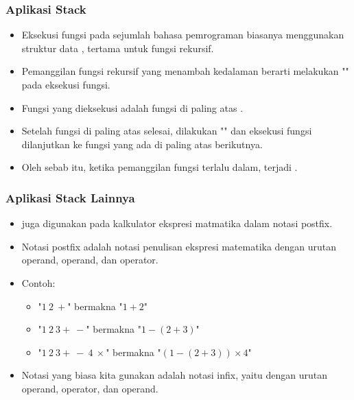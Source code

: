 \begin{frame}
\frametitle{Aplikasi Stack}
\begin{itemize}
  \item Eksekusi fungsi pada sejumlah bahasa pemrograman biasanya menggunakan struktur data , tertama untuk fungsi rekursif.
  \item Pemanggilan fungsi rekursif yang menambah kedalaman berarti melakukan "" pada  eksekusi fungsi.
  \item Fungsi yang dieksekusi adalah fungsi di paling atas .
  \item Setelah fungsi di paling atas selesai, dilakukan "" dan eksekusi fungsi dilanjutkan ke fungsi yang ada di paling atas  berikutnya.
  \item Oleh sebab itu, ketika pemanggilan fungsi terlalu dalam, terjadi .
\end{itemize}
\end{frame}

\begin{frame}
\frametitle{Aplikasi Stack Lainnya}
\begin{itemize}
  \item {} juga digunakan pada kalkulator ekspresi matmatika dalam notasi postfix.
  \item Notasi postfix adalah notasi penulisan ekspresi  matematika dengan urutan operand, operand, dan operator.
  \item Contoh:
  \begin{itemize}
    \item "$1 \ 2 \ +$" bermakna "$1 + 2$"
    \item "$1 \ 2 \ 3 + \ -$" bermakna "$1 - (2 + 3)$"
    \item "$1 \ 2 \ 3 + \ - \ 4 \ \times$" bermakna "$(1 - (2 + 3)) \times 4$"
  \end{itemize}
  \item Notasi yang biasa kita gunakan adalah notasi infix, yaitu dengan urutan operand, operator, dan operand.
\end{itemize}
\end{frame}

